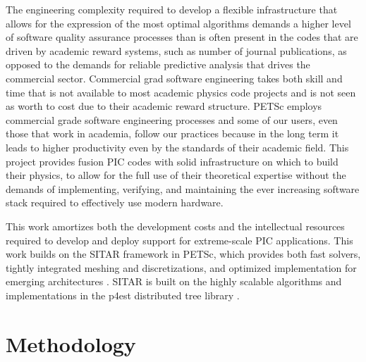 \documentclass[review]{siamart}
\begin{document}
The engineering complexity required to develop a flexible infrastructure that allows for the expression of the most optimal algorithms demands a higher level of software quality assurance processes than is often present in the codes that are driven by academic reward systems, such as number of journal publications, as opposed to the demands for reliable predictive analysis that drives the commercial sector.
Commercial grad software engineering takes both skill and time that is not available to most academic physics code projects and is not seen as worth to cost due to their academic reward structure.
PETSc employs commercial grade software engineering processes and some of our users, even those that work in academia, follow our practices because in the long term it leads to higher productivity even by the standards of their academic field. 
This project provides fusion PIC codes with solid infrastructure on which to build their physics, to allow for the full use of their theoretical expertise without the demands of implementing, verifying, and maintaining the ever increasing software stack required to effectively use modern hardware.

This work amortizes both the development costs and the intellectual resources required to develop and deploy support for extreme-scale PIC applications.
This work builds on the SITAR framework in PETSc, which provides both fast solvers, tightly integrated meshing and discretizations, and optimized implementation for emerging architectures \cite{KnepleyBrownMcInnesSmithRuppAdams2015}.
SITAR is built on the highly scalable algorithms and implementations in the p4est distributed tree library \cite{DBLP:journals/siamsc/IsaacBWG15,Rudi:2015:EIS:2807591.2807675,Stadler1033}.

\section{Methodology}
\end{document}
